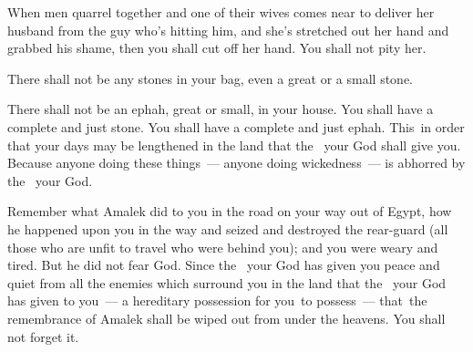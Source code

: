 \begin{inparaenum}
   When men quarrel together and one of their wives comes near to deliver her husband from the guy who's hitting him, and she's stretched out her hand and grabbed his shame,%
   then you shall cut off her hand. You shall not pity her.%

   There shall not be any stones in your bag, even a great or a small stone.%

   There shall not be an ephah, great or small, in your house.%
   You shall have a complete and just stone. You shall have a complete and just ephah. This\understood{}\ in order that your days may be lengthened in the land that the \lord\ your God shall give you.%
   Because anyone doing these things~--- anyone doing wickedness~--- is abhorred by the \lord\ your God.%

   Remember what Amalek did to you in the road on your way out of Egypt,%
   how he happened upon you in the way and seized and destroyed the rear-guard (all those who are unfit to travel who were behind you); and you were weary and tired. But he did not fear God.%
   Since the \lord\ your God has given you peace and quiet from all the enemies which surround you in the land that the \lord\ your God has given to you~--- a hereditary possession for you\understood{}\ to possess~--- that\understood{}\ the remembrance of Amalek shall be wiped out from under the heavens. You shall not forget it.%
\end{inparaenum}
